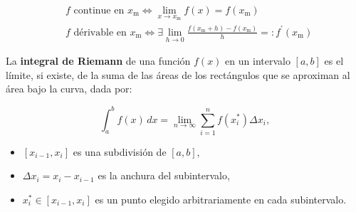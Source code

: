 \begin{f}

\[
\begin{aligned}
& f \text { continue en } x_\mathrm{m} \Leftrightarrow \lim _{x \rightarrow x_\mathrm{m}} f(x)=f\left(x_\mathrm{m}\right) \\
& f \text { dérivable en } x_\mathrm{m} \Leftrightarrow \exists \lim _{h \rightarrow 0} \frac{f\left(x_\mathrm{m}+h\right)-f\left(x_\mathrm{m}\right)}{h}=: f^{\prime}\left(x_\mathrm{m}\right)
\end{aligned}
\]
 
La \textbf{integral de Riemann} de una función \( f(x) \) en un intervalo \([a, b]\) es el límite, si existe, de la suma de las áreas de los rectángulos que se aproximan al área bajo la curva, dada por:  

\[
\int_a^b f(x) \, dx = \lim_{n \to \infty} \sum_{i=1}^n f(x_i^*) \Delta x_i,
\]
\begin{itemize}
	\item \( [x_{i-1}, x_i] \) es una subdivisión de \([a, b]\),  
	\item \( \Delta x_i = x_i - x_{i-1} \) es la anchura del subintervalo,  
	\item \( x_i^* \in [x_{i-1}, x_i] \) es un punto elegido arbitrariamente en cada subintervalo.
\end{itemize}
  

\end{f}
